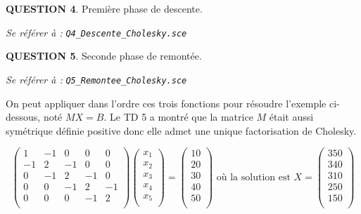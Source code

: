 \documentclass[a4paper,11pt]{article}
\newcommand{\quest}[1]{\small\textbf{#1}\normalsize}
\theoremstyle{nonumberplain}
\theoremstyle{nonumberplain}
\theoremstyle{nonumberplain}
\begin{document}
    \bigskip
    \quest{QUESTION 4}. Première phase de descente.
    \begin{ref_scilab}
        \emph{Se référer à :} \texttt{\emph{Q4\_Descente\_Cholesky.sce}}
    \end{ref_scilab}

    \bigskip
    \quest{QUESTION 5}. Seconde phase de remontée.
    \begin{ref_scilab}
        \emph{Se référer à :} \texttt{\emph{Q5\_Remontee\_Cholesky.sce}}
    \end{ref_scilab}

    On peut appliquer dans l'ordre ces trois fonctions pour résoudre l'exemple ci-dessous, noté $MX = B$.
    Le TD 5 a montré que la matrice $M$ était aussi symétrique définie positive
    donc elle admet une unique factorisation de Cholesky.

      \[
      \begin{pmatrix}
          1   &   -1    &   0     &   0     &   0   \\
          -1  &   2     &   -1    &   0     &   0   \\
          0   &   -1    &   2     &   -1    &   0   \\
          0   &   0     &   -1    &   2     &   -1  \\
          0   &   0     &   0     &   -1    &   2   \\
      \end{pmatrix}
      \begin{pmatrix}
          x_1 \\
          x_2 \\
          x_3 \\
          x_4 \\
          x_5 \\
      \end{pmatrix}
      =
      \begin{pmatrix}
          10 \\
          20 \\
          30 \\
          40 \\
          50 \\
      \end{pmatrix}
      \text{ où la solution est }
      X =
      \begin{pmatrix}
          350 \\
          340 \\
          310 \\
          250 \\
          150 \\
      \end{pmatrix}
      \]
\end{document}
